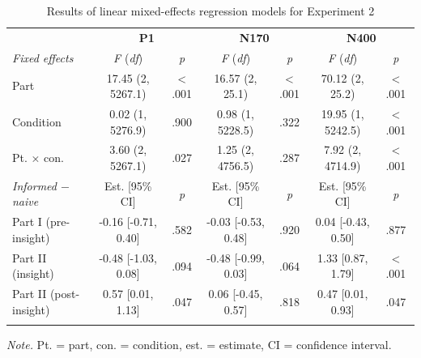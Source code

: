 \documentclass[
  english,
  man,11pt,floatsintext]{apa7}
\begin{document}
\begin{table}[tbp]

\begin{center}
\begin{threeparttable}

\caption{\label{tab:exp2-table}Results of linear mixed-effects regression models for Experiment 2}

\footnotesize{

\begin{tabular}{lcccccc}
\toprule
 & \multicolumn{2}{c}{\textbf{P1}} & \multicolumn{2}{c}{\textbf{N170}} & \multicolumn{2}{c}{\textbf{N400}} \\
\cmidrule(r){2-3} \cmidrule(r){4-5} \cmidrule(r){6-7}
\textit{Fixed effects} & \textit{F} (\textit{df}) & \textit{p} & \textit{F} (\textit{df}) & \textit{p} & \textit{F} (\textit{df}) & \textit{p}\\
\midrule
Part & 17.45 (2, 5267.1) & < .001 & 16.57 (2, 25.1) & < .001 & 70.12 (2, 25.2) & < .001\\
Condition & 0.02 (1, 5276.9) & .900 & 0.98 (1, 5228.5) & .322 & 19.95 (1, 5242.5) & < .001\\
Pt. × con. & 3.60 (2, 5267.1) & .027 & 1.25 (2, 4756.5) & .287 & 7.92 (2, 4714.9) & < .001\\
\textit{Informed $-$  naive} & Est. [95\% CI] & \textit{p} & Est. [95\% CI] & \textit{p} & Est. [95\% CI] & \textit{p}\\ \midrule
Part I (pre-insight) & -0.16 [-0.71, 0.40] & .582 & -0.03 [-0.53, 0.48] & .920 & 0.04 [-0.43, 0.50] & .877\\
Part II (insight) & -0.48 [-1.03, 0.08] & .094 & -0.48 [-0.99, 0.03] & .064 & 1.33 [0.87, 1.79] & < .001\\
Part II (post-insight) & 0.57 [0.01, 1.13] & .047 & 0.06 [-0.45, 0.57] & .818 & 0.47 [0.01, 0.93] & .047\\
\bottomrule
\addlinespace
\end{tabular}

}

\begin{tablenotes}[para]
\normalsize{\textit{Note.} Pt. = part, con. = condition, est. = estimate, CI = confidence interval.}
\end{tablenotes}

\end{threeparttable}
\end{center}

\end{table}
\end{document}
